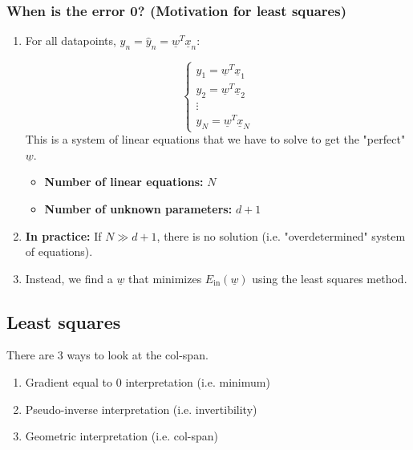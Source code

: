     \subsubsection{When is the error 0? (Motivation for least squares)}
    \begin{intuition}
        \begin{enumerate}

            \item For all datapoints, $y_n = \hat{y}_n = \underline{w}^T \underline{x}_n$: 
            
            \[
            \begin{cases}
            y_1 = \underline{w}^T \underline{x}_1 \\
            y_2 = \underline{w}^T \underline{x}_2 \\
            \vdots \\
            y_N = \underline{w}^T \underline{x}_N
            \end{cases}
            \]
            This is a system of linear equations that we have to solve to get the "perfect" \( \underline{w} \).
        
            \begin{itemize}
                \item \textbf{Number of linear equations:} $N$ 
                \item \textbf{Number of unknown parameters:} $d+1$
            \end{itemize}
        
            \item \textbf{In practice:} If $N \gg d+1$, there is no solution (i.e. "overdetermined" system of equations).
        
            \item Instead, we find a $\underline{w}$ that minimizes $E_{\text{in}}(\underline{w})$ using the least squares method.
        
        \end{enumerate}
    \end{intuition}

\subsection{Least squares}
    \begin{intuition}
        There are 3 ways to look at the col-span.
        \begin{enumerate}
            \item Gradient equal to 0 interpretation (i.e. minimum)
            \item Pseudo-inverse interpretation (i.e. invertibility)
            \item Geometric interpretation (i.e. col-span)
        \end{enumerate}
    \end{intuition}
